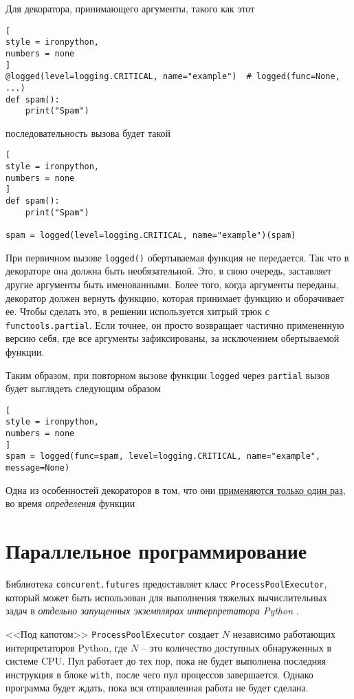 \documentclass[%
	11pt,
	a4paper,
	utf8,
		]{article}
\begin{document}
Для декоратора, принимающего аргументы, такого как этот
\begin{lstlisting}[
style = ironpython,
numbers = none
]
@logged(level=logging.CRITICAL, name="example")  # logged(func=None, ...)
def spam():
    print("Spam")
\end{lstlisting}
последовательность вызова будет такой
\begin{lstlisting}[
style = ironpython,
numbers = none
]
def spam():
    print("Spam")

spam = logged(level=logging.CRITICAL, name="example")(spam)
\end{lstlisting}

При первичном вызове \verb|logged()| обертываемая функция не передается. Так что в декораторе она должна быть необязательной. Это, в свою очередь, заставляет другие аргументы быть именованными. Более того, когда аргументы переданы, декоратор должен вернуть функцию, которая принимает функцию и оборачивает ее. Чтобы сделать это, в решении используется хитрый трюк с \texttt{functools.partial}. Если точнее, он просто возвращает частично примененную версию себя, где все аргументы зафиксированы, за исключением обертываемой функции.

Таким образом, при повторном вызове функции \texttt{logged} через \texttt{partial} вызов будет выглядеть следующим образом
\begin{lstlisting}[
style = ironpython,
numbers = none
]
spam = logged(func=spam, level=logging.CRITICAL, name="example", message=None)
\end{lstlisting}

Одна из особенностей декораторов в том, что они \underline{применяются только один раз}, во время \emph{определения} функции \cite[]{beazley:python_cookbook-2019}

\section{Параллельное программирование}

Библиотека \texttt{concurent.futures} предоставляет класс \texttt{ProcessPoolExecutor}, который может быть использован для выполнения тяжелых вычислительных задач в \emph{отдельно запущенных экземплярах интерпретатора Python} \cite[]{beazley:python_cookbook-2019}.

<<Под капотом>> \texttt{ProcessPoolExecutor} создает $ N $ независимо работающих интерпретаторов Python, где $ N $ -- это количество доступных обнаруженных в системе CPU. Пул работает до тех пор, пока не будет выполнена последняя инструкция в блоке \texttt{with}, после чего пул процессов завершается. Однако программа будет ждать, пока вся отправленная работа не будет сделана.
\end{document}

